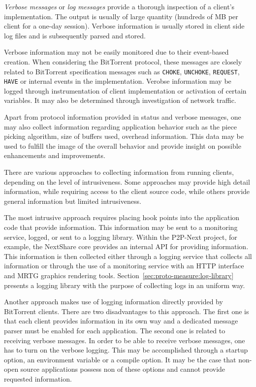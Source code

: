 \textit{Verbose messages} or \textit{log messages} provide a thorough
inspection of a client's implementation. The output is usually of large
quantity (hundreds of MB per client for a one-day session). Verbose
information is usually stored in client side log files and is subsequently
parsed and stored.

Verbose information may not be easily monitored due to their event-based
creation. When considering the BitTorrent protocol, these messages are
closely related to BitTorrent specification messages such as \texttt{CHOKE},
\texttt{UNCHOKE}, \texttt{REQUEST}, \texttt{HAVE} or internal events in the
implementation. Verobse information may be logged through instrumentation of
client implementation or activation of certain variables. It may also be
determined through investigation of network traffic.

Apart from protocol information provided in status and verbose messages, one
may also collect information regarding application behavior such as the piece
picking algorithm, size of buffers used, overhead information. This data may
be used to fulfill the image of the overall behavior and provide insight on
possible enhancements and improvements.

There are various approaches to collecting information from running clients,
depending on the level of intrusiveness. Some approaches may provide high
detail information, while requiring access to the client source code, while
others provide general information but limited intrusiveness.

The most intrusive approach requires placing hook points into the application
code that provide information. This information may be sent to a monitoring
service, logged, or sent to a logging library. Within the P2P-Next project,
for example, the NextShare core provides an internal API for providing
information. This information is then collected either through a logging
service that collects all information or through the use of a monitoring
service with an HTTP interface and MRTG graphics rendering tools.
Section~\ref{sec:proto-measure:log-library} presents a logging library with
the purpose of collecting logs in an uniform way.

Another approach makes use of logging information directly provided by
BitTorrent clients. There are two disadvantages to this approach. The first
one is that each client provides information in its own way and a dedicated
message parser must be enabled for each application. The second one is related
to receiving verbose messages. In order to be able to receive verbose
messages, one has to turn on the verbose logging. This may be accomplished
through a startup option, an environment variable or a compile option. It may
be the case that non-open source applications possess non of these options and
cannot provide requested information.

